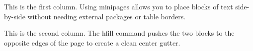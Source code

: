 \documentclass{article}
\begin{document}
\begin{minipage}{0.45\textwidth}
This is the first column. Using minipages allows you to place blocks of text side-by-side without needing external packages or table borders.
\end{minipage}
\hfill
\begin{minipage}{0.45\textwidth}
This is the second column. The hfill command pushes the two blocks to the opposite edges of the page to create a clean center gutter.
\end{minipage}
\end{document}
